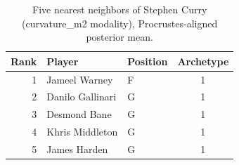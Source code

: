 \begin{table}[htbp]
  \centering\small
  \begin{tabular}{rllc}
    \toprule
    Rank & Player & Position & Archetype \\
    \midrule
    1 & Jameel Warney & F & 1 \\
    2 & Danilo Gallinari & G & 1 \\
    3 & Desmond Bane & G & 1 \\
    4 & Khris Middleton & G & 1 \\
    5 & James Harden & G & 1 \\
    \bottomrule
  \end{tabular}
  \caption{Five nearest neighbors of Stephen Curry (curvature_m2 modality), Procrustes-aligned posterior mean.}
  \label{tab:Stephen_Curry_neighbors_curvature_m2}
\end{table}

